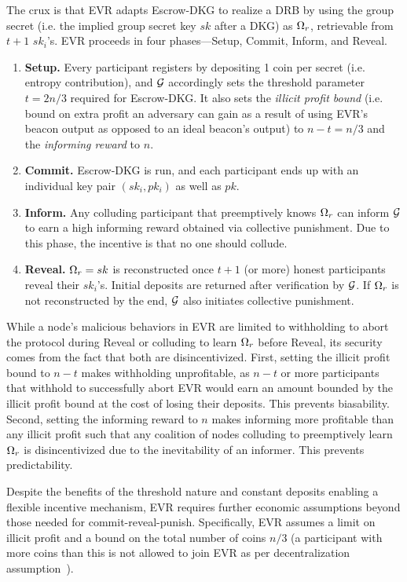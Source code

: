 The crux is that EVR adapts Escrow-DKG to realize a DRB by using the group secret (i.e. the implied group secret key $sk$ after a DKG) as $\Omega_r$, retrievable from $t + 1$ $sk_i$'s. EVR proceeds in four phases---Setup, Commit, Inform, and Reveal.
\begin{enumerate}
    \item \textbf{Setup.} Every participant registers by depositing 1 coin per secret (i.e. entropy contribution), and $\mathcal{G}$ accordingly sets the threshold parameter $t = 2n / 3$ required for Escrow-DKG. It also sets the \textit{illicit profit bound} (i.e. bound on extra profit an adversary can gain as a result of using EVR's beacon output as opposed to an ideal beacon's output) to $n - t = n / 3$ and the \textit{informing reward} to $n$.
    \item \textbf{Commit.} Escrow-DKG is run, and each participant ends up with an individual key pair $(sk_i, pk_i)$ as well as $pk$.
    \item \textbf{Inform.} Any colluding participant that preemptively knows $\Omega_r$ can inform $\mathcal{G}$ to earn a high informing reward obtained via collective punishment. Due to this phase, the incentive is that no one should collude.
    \item \textbf{Reveal.} $\Omega_r = sk$ is reconstructed once $t + 1$ (or more) honest participants reveal their $sk_i$'s. Initial deposits are returned after verification by $\mathcal{G}$. If $\Omega_r$ is not reconstructed by the end, $\mathcal{G}$ also initiates collective punishment.
\end{enumerate}

While a node's malicious behaviors in EVR are limited to withholding to abort the protocol during Reveal or colluding to learn $\Omega_r$ before Reveal, its security comes from the fact that both are disincentivized. First, setting the illicit profit bound to $n - t$ makes withholding unprofitable, as $n - t$ or more participants that withhold to successfully abort EVR would earn an amount bounded by the illicit profit bound at the cost of losing their deposits. This prevents biasability. Second, setting the informing reward to $n$ makes informing more profitable than any illicit profit such that any coalition of nodes colluding to preemptively learn $\Omega_r$ is disincentivized due to the inevitability of an informer. This prevents predictability.

Despite the benefits of the threshold nature and constant deposits enabling a flexible incentive mechanism, EVR requires further economic assumptions beyond those needed for commit-reveal-punish. Specifically, EVR assumes a limit on illicit profit and a bound on the total number of coins $n / 3$ (a participant with more coins than this is not allowed to join EVR as per decentralization assumption~\cite{david2020economically}).

